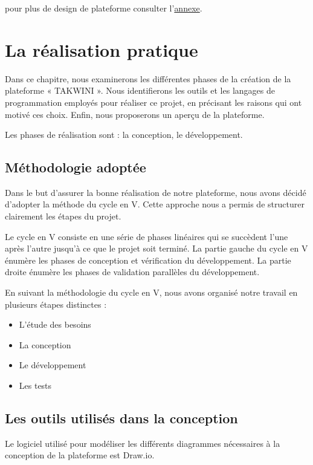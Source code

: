 \documentclass{article}
\begin{document}
  pour plus de design de plateforme consulter l'\hyperref[annexe-design]{annexe}.


  \newpage
\section{La réalisation pratique}


\hspace*{2em}Dans ce chapitre, nous examinerons les différentes phases de la création de la plateforme « TAKWINI ». Nous identifierons les outils et les langages de programmation employés pour réaliser ce projet, en précisant les raisons qui ont motivé ces choix. Enfin, nous proposerons un aperçu de la plateforme.

\noindent Les phases de réalisation sont : la conception, le développement.
\subsection{Méthodologie adoptée}

\hspace*{2em}Dans le but d'assurer la bonne réalisation de notre plateforme, nous avons décidé d'adopter la méthode du cycle en V. Cette approche nous a permis de structurer clairement les étapes du projet.

\noindent Le cycle en V consiste en une série de phases linéaires qui se succèdent l'une après l'autre jusqu'à ce que le projet soit terminé. La partie gauche du cycle en V énumère les phases de conception et vérification du développement. La partie droite énumère les phases de validation parallèles du développement.

\noindent En suivant la méthodologie du cycle en V, nous avons organisé notre travail en plusieurs étapes distinctes :
\begin{itemize}
    \item L’étude des besoins 
    \item La conception
    \item Le développement
    \item Les tests
\end{itemize}

\subsection{Les outils utilisés dans la conception}
Le logiciel utilisé pour modéliser les différents diagrammes nécessaires à la conception de la plateforme est Draw.io.
\end{document}
